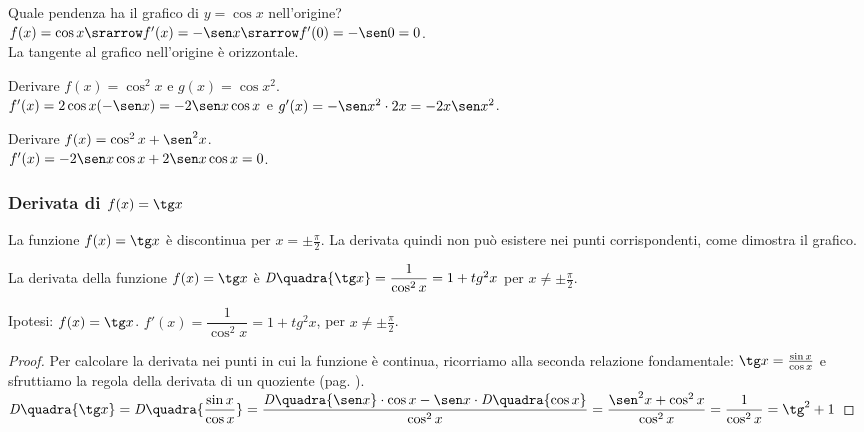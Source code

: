 \begin{esempio}
Quale pendenza ha il grafico di $y=\cos x$ nell'origine?\\
$f(x)= \cos x \srarrow f'(x)=-\sen x\srarrow f'(0)=-\sen 0=0$.\\
La tangente al grafico nell'origine è orizzontale.
\end{esempio} 

\begin{esempio}
Derivare $f(x)=\cos^2 x$ e $g(x)= \cos x^2$.\\
$f'(x)=2\cos x(-\sen x)=-2\sen x\cos x$ e $g'(x)=-\sen x^2\cdot 2x=-2x\sen x^2$.
\end{esempio}

\begin{esempio}
Derivare $f(x)=\cos^2 x +\sen^2 x$.\\
$f'(x)=-2\sen x\cos x + 2\sen x \cos x = 0$.
\end{esempio}


\subsubsection{Derivata di $f(x)=\tg x$}
La funzione $f(x)=\tg x$ è discontinua per $x= \pm\frac{\pi}{2}$. La derivata
quindi non può esistere nei punti corrispondenti, come dimostra il grafico.

\begin{inaccessibleblock}
  \begin{minipage}[]{.47\textwidth}
    \begin{center} \tangente \end{center}
 \end{minipage} 
  \hfill
 \begin{minipage}[]{.47\textwidth}
 \begin{center} \tangentitangente \end{center}
 \end{minipage}
\end{inaccessibleblock}
\label{}

\begin{teorema}
   La derivata della funzione $f(x)=\tg x$ è $\mathit{D}\quadra{\tg x}=
   \dfrac{1}{\cos^2 x}=1+tg^2 x$ per $x\ne \pm\frac{\pi}{2}$.
\end{teorema}
\noindent Ipotesi: $f(x)=\tg x$. \tab $f'(x)=\dfrac{1}{\cos^2 x}=1+tg^2 x$,
per $x\ne\pm\frac{\pi}{2}$.
\begin{proof}
Per calcolare la derivata nei punti in cui la funzione è continua, ricorriamo
alla seconda relazione fondamentale: $\tg x=\frac{\sin x}{\cos x}$ e
sfruttiamo la regola della derivata di un quoziente (pag. 
\pageref{sec:diff01_regolederivate}).\\
$\mathit{D}\quadra{\tg x}=\mathit{D}\quadra{\dfrac{\sin x}{\cos x}}=
\dfrac{\mathit{D}\quadra{\sen x}\cdot \cos x-\sen x\cdot 
  \mathit{D}\quadra{\cos x}} {\cos^2 x}=
\dfrac{\sen^2 x +\cos^2 x}{\cos^2 x}=\dfrac{1}{\cos^2 x}=\tg^2+1$
\end{proof}

